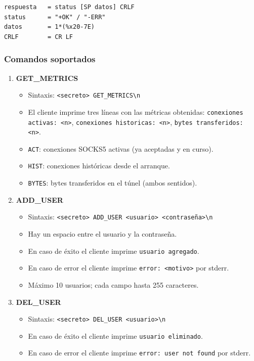 \documentclass[12pt,a4paper]{article}
\begin{document}
\begin{lstlisting}[caption=Gramática ABNF de respuestas]
respuesta   = status [SP datos] CRLF
status      = "+OK" / "-ERR"
datos       = 1*(%x20-7E)
CRLF        = CR LF
\end{lstlisting}

\subsubsection{Comandos soportados}

\begin{enumerate}
    \item \textbf{GET\_METRICS}
    \begin{itemize}
        \item Sintaxis: \verb|<secreto> GET_METRICS\n|
        \item El cliente imprime tres líneas con las métricas obtenidas:
              \texttt{conexiones activas: <n>}, \texttt{conexiones historicas: <n>},
              \texttt{bytes transferidos: <n>}.
        \item \texttt{ACT}: conexiones SOCKS5 activas (ya aceptadas y en curso).
        \item \texttt{HIST}: conexiones históricas desde el arranque.
        \item \texttt{BYTES}: bytes transferidos en el túnel (ambos sentidos).
    \end{itemize}

    \item \textbf{ADD\_USER}
    \begin{itemize}
        \item Sintaxis: \verb|<secreto> ADD_USER <usuario> <contraseña>\n|
        \item Hay un espacio entre el usuario y la contraseña.
        \item En caso de éxito el cliente imprime \texttt{usuario agregado}.
        \item En caso de error el cliente imprime \texttt{error: <motivo>} por stderr.
        \item Máximo 10 usuarios; cada campo hasta 255 caracteres.
    \end{itemize}

    \item \textbf{DEL\_USER}
    \begin{itemize}
        \item Sintaxis: \verb|<secreto> DEL_USER <usuario>\n|
        \item En caso de éxito el cliente imprime \texttt{usuario eliminado}.
        \item En caso de error el cliente imprime \texttt{error: user not found} por stderr.
    \end{itemize}


\end{enumerate}
\end{document}
